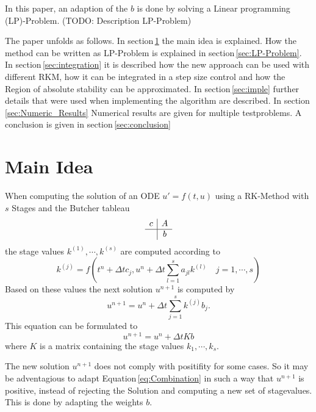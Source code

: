 \documentclass{article}
\begin{document}
In this paper, an adaption of the $b$ is done by solving a Linear programming (LP)-Problem.
(TODO: Description LP-Problem)

The paper unfolds as follows. In section\,\ref{sec:main_idea} the main idea is explained. How the method can be written as LP-Problem is explained in section\,\ref{sec:LP-Problem}.
In section\,\ref{sec:integration} it is described how the new approach can be used with different RKM, how it can be integrated in a step size control and how the Region of absolute stability can be approximated.  
In section\,\ref{sec:imple} further details that were used when implementing the algorithm are described.
In section\,\ref{sec:Numeric_Results} Numerical results are given for multiple testproblems.
A conclusion is given in section\,\ref{sec:conclusion}  



\section{Main Idea}\label{sec:main_idea}

When computing the solution of an ODE $u ' = f(t,u) $ using a RK-Method with $s$ Stages and the Butcher tableau
\begin{align}
\begin{array}{c|c}
c &  A \\
\hline
 & b\\
\end{array}
\end{align}
the stage values $k^{(1)},\cdots,k^{(s)}$ are computed according to
\begin{equation}
k^{(j)} =  f(t^n + \Delta t c_j, u^n + \Delta t \sum_{l = 1}^{s} a_{jl} k^{(l)}  \quad j = 1,\cdots,s)
\end{equation}
Based on these values the next solution $u^{n+1}$ is computed by
\begin{equation}
u^{n+1} = u^n + \Delta t \sum_{j  = 1}^s k^{(j)} b_j .
\end{equation}
This equation can be formulated to
\begin{equation}\label{eq:Combination}
u^{n+1} = u^n + \Delta t K b
\end{equation}
where $K$ is a matrix containing the stage values $k_1,\cdots,k_s$.

The new solution $u^{n+1}$ does not comply with positifity for some cases. 
So it may be adventagious to adapt Equation\,\ref{eq:Combination} in such a way that $u^{n+1}$ is positive, instead of rejecting the Solution and computing a new set of stagevalues. This is done by adapting the weights $b$.
\end{document}
